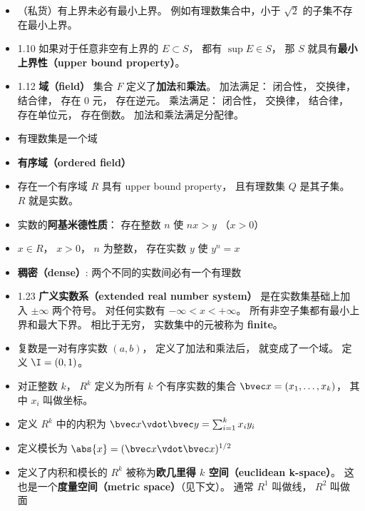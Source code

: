 \begin{itemize}
\item （私货）有上界未必有最小上界。 例如有理数集合中，小于 $\sqrt{2}$ 的子集不存在最小上界。

\item 1.10 如果对于任意非空有上界的 $E \subset S$， 都有 $\sup E \in S$， 那 $S$ 就具有\textbf{最小上界性（upper bound property）}。

\item 1.12 \textbf{域（field）} 集合 $F$ 定义了\textbf{加法}和\textbf{乘法}。 加法满足： 闭合性， 交换律， 结合律， 存在 0 元， 存在逆元。 乘法满足： 闭合性， 交换律， 结合律， 存在单位元， 存在倒数。 加法和乘法满足分配律。

\item 有理数集是一个域

\item \textbf{有序域（ordered field）}

\item 存在一个有序域 $R$ 具有 upper bound property， 且有理数集 $Q$ 是其子集。 $R$ 就是实数。

\item 实数的\textbf{阿基米德性质}： 存在整数 $n$ 使 $nx > y$ （$x > 0$）

\item $x \in R$， $x > 0$， $n$ 为整数， 存在实数 $y$ 使 $y^n = x$

\item \textbf{稠密（dense）}: 两个不同的实数间必有一个有理数

\item 1.23 \textbf{广义实数系（extended real number system）} 是在实数集基础上加入 $\pm\infty$ 两个符号。 对任何实数有 $-\infty < x < +\infty$。 所有非空子集都有最小上界和最大下界。 相比于无穷， 实数集中的元被称为 \textbf{finite}。

\item 复数是一对有序实数 $(a, b)$， 定义了加法和乘法后， 就变成了一个域。 定义 $\I = (0, 1)$。

\item 对正整数 $k$， $R^k$ 定义为所有 $k$ 个有序实数的集合 $\bvec x = (x_1, \dots, x_k)$， 其中 $x_i$ 叫做坐标。

\item 定义 $R^k$ 中的内积为 $\bvec x \vdot \bvec y = \sum_{i = 1}^k x_i y_i$

\item 定义模长为 $\abs{x} = (\bvec x \vdot \bvec x)^{1/2}$

\item 定义了内积和模长的 $R^k$ 被称为\textbf{欧几里得 $k$ 空间（euclidean k-space）}。 这也是一个\textbf{度量空间（metric space）}（见下文）。 通常 $R^1$ 叫做线， $R^2$ 叫做面
\end{itemize}

